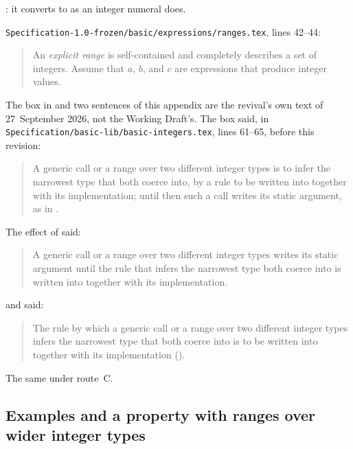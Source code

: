 \begin{description}
: it converts to  as an integer
numeral does.
\item[Original text] \nolinkurl{Specification-1.0-frozen/basic/expressions/ranges.tex},
lines 42--44:
\begin{quote}
An \emph{explicit range}
is self-contained and completely describes a set of integers.  Assume that
$a$, $b$, and $c$ are expressions that produce integer values.
\end{quote}
The box in  and two sentences of this appendix are the
revival's own text of 27~September 2026, not the Working Draft's.
The box said, in \nolinkurl{Specification/basic-lib/basic-integers.tex}, lines
61--65, before this revision:
\begin{quote}
A generic call or a range over two different integer types is to infer the
narrowest type that both coerce into, by a rule to be written into
 together with its implementation; until then such a
call writes its static argument, as in
.
\end{quote}
The effect of  said:
\begin{quote}
A generic call or a range over two different integer types writes its static
argument until the rule that infers the narrowest type both coerce into is
written into  together with its implementation.
\end{quote}
and  said:
\begin{quote}
The rule by which a generic call or a range over two different integer types
infers the narrowest type that both coerce into is to be written into
 together with its implementation
().
\end{quote}
\item[Route C] The same under route~C.
\end{description}

\subsection{Examples and a property with ranges over wider integer types}

